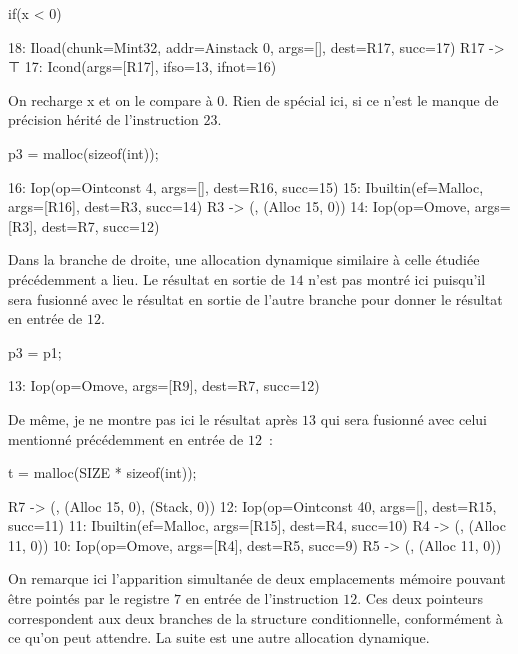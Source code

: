 \documentclass{article}
\begin{document}
\begin{cc}
if(x < 0)
\end{cc}
\begin{coq}
18: Iload(chunk=Mint32, addr=Ainstack 0, args=[], dest=R17, succ=17)
R17 -> ⊤
17: Icond(args=[R17], ifso=13, ifnot=16)
\end{coq}

On recharge x et on le compare à 0. Rien de spécial ici, si ce n'est le manque
de précision hérité de l'instruction $23$.

\begin{cc}
p3 = malloc(sizeof(int));
\end{cc}
\begin{coq}
16: Iop(op=Ointconst 4, args=[], dest=R16, succ=15)
15: Ibuiltin(ef=Malloc, args=[R16], dest=R3, succ=14)
R3 -> ({}, {(Alloc 15, 0)})
14: Iop(op=Omove, args=[R3], dest=R7, succ=12)
\end{coq}

Dans la branche de droite, une allocation dynamique similaire à celle étudiée
précédemment a lieu. Le résultat en sortie de $14$ n'est pas
montré ici puisqu'il sera fusionné avec le résultat en sortie de l'autre
branche pour donner le résultat en entrée de $12$.

\begin{cc}
p3 = p1;
\end{cc}
\begin{coq}
13: Iop(op=Omove, args=[R9], dest=R7, succ=12)
\end{coq}

De même, je ne montre pas ici le résultat après $13$ qui sera
fusionné avec celui mentionné précédemment en entrée de $12$~:

\begin{cc}
t = malloc(SIZE * sizeof(int));
\end{cc}
\begin{coq}
R7 -> ({}, {(Alloc 15, 0), (Stack, 0)})
12: Iop(op=Ointconst 40, args=[], dest=R15, succ=11)
11: Ibuiltin(ef=Malloc, args=[R15], dest=R4, succ=10)
R4 -> ({}, {(Alloc 11, 0)})
10: Iop(op=Omove, args=[R4], dest=R5, succ=9)
R5 -> ({}, {(Alloc 11, 0)})
\end{coq}

On remarque ici l'apparition simultanée de deux emplacements mémoire pouvant
être pointés par le registre $7$ en entrée de l'instruction
$12$. Ces deux pointeurs correspondent aux deux branches de la
structure conditionnelle, conformément à ce qu'on peut attendre. La suite est
une autre allocation dynamique.
\end{document}
